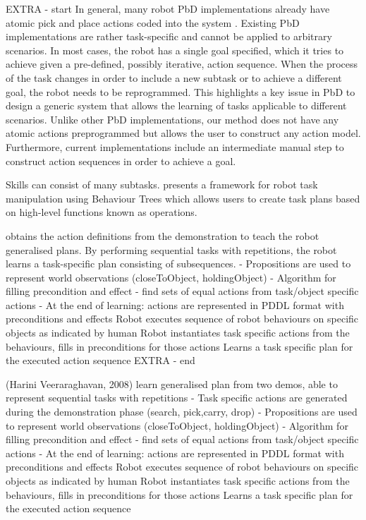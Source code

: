 EXTRA - start
In general, many robot PbD implementations already have atomic pick and place actions coded into the system \cite{veeraraghavan2008teaching}.
Existing PbD implementations are rather task-specific and cannot be applied to arbitrary scenarios.  In most cases, the robot has a single goal specified, which it tries to achieve given a pre-defined, possibly iterative, action sequence. When the process of the task changes in order to include a new subtask or to achieve a different goal, the robot needs to be reprogrammed. This highlights a key issue in PbD to design a generic system that allows the learning of tasks applicable to different scenarios. Unlike other PbD implementations, our method does not have any atomic actions preprogrammed but allows the user to construct any action model.
Furthermore, current implementations include an intermediate manual step to construct action sequences in order to achieve a goal.

Skills can consist of many subtasks. 
\cite{guerin2015framework} presents a framework for robot task manipulation using Behaviour Trees which allows users to create task plans based on high-level functions known as operations.

\cite{veeraraghavan2008teaching} obtains the action definitions from the demonstration to teach the robot generalised plans. By performing sequential tasks with repetitions, the robot learns a task-specific plan consisting of subsequences.
- Propositions are used to represent world observations (closeToObject, holdingObject)
- Algorithm for filling precondition and effect - find sets of equal actions from task/object specific actions
- At the end of learning: actions are represented in PDDL format with preconditions and effects
Robot executes sequence of robot behaviours on specific objects as indicated by human
Robot instantiates task specific actions from the behaviours, fills in preconditions for those actions
Learns a task specific plan for the executed action sequence
EXTRA - end

(Harini Veeraraghavan, 2008)
learn generalised plan from two demos, able to represent sequential tasks with repetitions
- Task specific actions are generated during the demonstration phase (search, pick,carry, drop)
- Propositions are used to represent world observations (closeToObject, holdingObject)
- Algorithm for filling precondition and effect - find sets of equal actions from task/object specific actions
- At the end of learning: actions are represented in PDDL format with preconditions and effects
Robot executes sequence of robot behaviours on specific objects as indicated by human
Robot instantiates task specific actions from the behaviours, fills in preconditions for those actions
Learns a task specific plan for the executed action sequence


